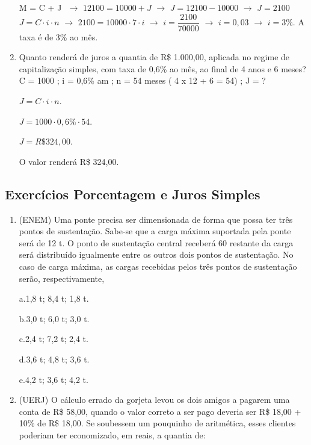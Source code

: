 \begin{multicols*}{2}
\begin{enumerate}
	M = C + J $\, \, \rightarrow \, \, 12100 = 10000 + J \, \, \rightarrow \, \, J = 12100 - 10000 \, \, \rightarrow \, \, J = 2100$\\
	
	$ J = C \cdot i \cdot n \, \, \rightarrow \, \,2100 = 10000 \cdot 7 \cdot i \, \, \rightarrow \, \, i = \dfrac{2100}{70000} \, \, \rightarrow \, \, i = 0,03 \, \, \rightarrow \, \, i = 3\% $. A taxa é de 3\% ao mês.
	
	\item Quanto renderá de juros a quantia de R\$ 1.000,00, aplicada no regime de capitalização simples, com taxa de 0,6\% ao mês, ao final de 4 anos e 6 meses? C = 1000 ; i = 0,6\% am ; n = 54 meses ( 4 x 12 + 6 = 54) ; J = ?
	
	$ J = C \cdot i \cdot n$.
	
	$ J = 1000 \cdot 0,6\% \cdot 54 $.
	
	$ J = R\$ 324,00 $.
	
	O valor renderá R\$ 324,00.
	
	  \end{enumerate}			

	\subsection{Exercícios Porcentagem e Juros Simples}
	
	\begin{enumerate}
	
	\item (ENEM) Uma ponte precisa ser dimensionada de forma que possa ter três pontos de sustentação. Sabe-se que a carga máxima suportada pela ponte será de 12 t. O ponto de sustentação central receberá 60%
restante da carga será distribuído igualmente entre os outros dois pontos de sustentação. No caso de carga máxima, as cargas recebidas pelos três pontos de sustentação serão, respectivamente,

a.1,8 t; 8,4 t; 1,8 t.

b.3,0 t; 6,0 t; 3,0 t.

c.2,4 t; 7,2 t; 2,4 t.

d.3,6 t; 4,8 t; 3,6 t.

e.4,2 t; 3,6 t; 4,2 t.

	\item (UERJ) O cálculo errado da gorjeta levou os dois amigos a pagarem uma conta de R\$ 58,00, quando o valor correto a ser pago deveria ser R\$ 18,00 + 10\% de R\$ 18,00. Se soubessem um pouquinho de aritmética, esses clientes
poderiam ter economizado, em reais, a quantia de:


\end{enumerate}
\end{multicols*}
